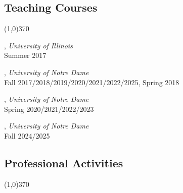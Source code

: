 \documentclass[10pt]{article}
\newenvironment{myindentpar}[1]%
{\begin{list}{}%
         {\setlength{\leftmargin}{#1}}%
         \item[]%
}
{\end{list}}
\newcounter{list}
\begin{document}
\subsection{\sc Teaching Courses}
\vspace{-0.4cm} \line(1,0){370} \vspace{-0.1cm}

\begin{myindentpar}{0.75cm}

\hspace{-0.75cm}{\bf CS 412 Introduction to Data Mining}, \textit{University of Illinois} \\
	Summer 2017
	
\hspace{-0.75cm}{\bf CSE 40647/60647 Data Science}, \textit{University of Notre Dame}  \\
	Fall 2017/2018/2019/2020/2021/2022/2025, Spring 2018

\hspace{-0.75cm}{\bf CSE 60326 Computational Behavior Modeling}, \textit{University of Notre Dame} \\
	Spring 2020/2021/2022/2023

\hspace{-0.75cm}{\bf CSE 60556 Large Language Models}, \textit{University of Notre Dame} \\
	Fall 2024/2025

\end{myindentpar}

\subsection{\sc Professional Activities}
\vspace{-0.4cm} \line(1,0){370} \vspace{-0.1cm}
\end{document}

